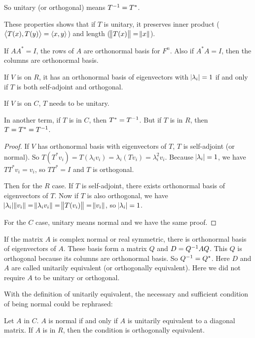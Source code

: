 So unitary (or orthogonal) means ${T}^{-1} = T^*$.

These properties shows that if $T$ is unitary, it preserves inner product ($\left\langle \displaystyle T(x), T(y) \right\rangle = \left\langle \displaystyle x, y \right\rangle$) and length ($\norm{T(x)} = \norm{x}$).


If $AA^* = I$, the rows of $A$ are orthonormal basis for $F^n$. Also if $A^*A = I$, then the columns are orthonormal basis.


\begin{theorem}
    If $V$ is on $R$, it has an orthonormal basis of eigenvectors with $\abs{\lambda_i} = 1$ if and only if $T$ is both self-adjoint and orthogonal.     
    
    If $V$ is on $C$, $T$ needs to be unitary.
    
    In another term, if $T$ is in $C$, then $T^* = {T}^{-1}$. But if $T$ is in $R$, then $T = T^* = {T}^{-1}$.
\end{theorem}
\begin{proof}
    If $V$ has orthonormal basis with eigenvectors of $T$, $T$ is self-adjoint (or normal). So $T(T^* v_i) = T (\lambda_i v_i) = \lambda_i (T v_i) = \lambda_i^2 v_i$. Because $\abs{\lambda_i} = 1$, we have $TT^* v_i = v_i$, so $TT^* = I$ and $T$ is orthogonal.
    
    Then for the $R$ case. If $T$ is self-adjoint, there exists orthonormal basis of eigenvectors of $T$. Now if $T$ is also orthogonal, we have $\abs{\lambda_i} \norm{v_i} = \norm{\lambda_i v_i} = \norm{T (v_i)} = \norm{v_i}$, so $\abs{\lambda_i} = 1$. 
    
    For the $C$ case, unitary means normal and we have the same proof.
\end{proof}



If the matrix $A$ is complex normal or real symmetric, there is orthonormal basis of eigenvectors of $A$. These basis form a matrix $Q$ and $D = {Q}^{-1} A Q$. This $Q$ is orthogonal because its columns are orthonormal basis. So ${Q}^{-1} = Q^*$. Here $D$ and $A$ are called unitarily equivalent (or orthogonally equivalent). Here we did not require $A$ to be unitary or orthogonal.

With the definition of unitarily equivalent, the necessary and sufficient condition of being normal could be rephrased:
\begin{theorem}
    Let $A$ in $C$. $A$ is normal if and only if $A$ is unitarily equivalent to a diagonal matrix. If $A$ is in $R$, then the condition is orthogonally equivalent.
\end{theorem}




